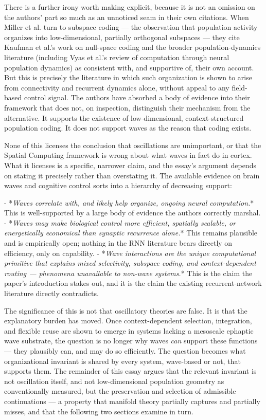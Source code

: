 \documentclass[11pt]{article}
\begin{document}
There is a further irony worth making explicit, because it is not an omission on the authors' part so much as an unnoticed seam in their own citations. When Miller et al. turn to subspace coding — the observation that population activity organizes into low-dimensional, partially orthogonal subspaces — they cite Kaufman et al.'s work on null-space coding and the broader population-dynamics literature (including Vyas et al.'s review of computation through neural population dynamics) as consistent with, and supportive of, their own account. But this is precisely the literature in which such organization is shown to arise from connectivity and recurrent dynamics alone, without appeal to any field-based control signal. The authors have absorbed a body of evidence into their framework that does not, on inspection, distinguish their mechanism from the alternative. It supports the existence of low-dimensional, context-structured population coding. It does not support waves as the reason that coding exists.

None of this licenses the conclusion that oscillations are unimportant, or that the Spatial Computing framework is wrong about what waves in fact do in cortex. What it licenses is a specific, narrower claim, and the essay's argument depends on stating it precisely rather than overstating it. The available evidence on brain waves and cognitive control sorts into a hierarchy of decreasing support:

- *\textit{Waves correlate with, and likely help organize, ongoing neural computation.}* This is well-supported by a large body of evidence the authors correctly marshal.
- *\textit{Waves may make biological control more efficient, spatially scalable, or energetically economical than synaptic recurrence alone.}* This remains plausible and is empirically open; nothing in the RNN literature bears directly on efficiency, only on capability.
- *\textit{Wave interactions are the unique computational primitive that explains mixed selectivity, subspace coding, and context-dependent routing — phenomena unavailable to non-wave systems.}* This is the claim the paper's introduction stakes out, and it is the claim the existing recurrent-network literature directly contradicts.

The significance of this is not that oscillatory theories are false. It is that the explanatory burden has moved. Once context-dependent selection, integration, and flexible reuse are shown to emerge in systems lacking a mesoscale ephaptic wave substrate, the question is no longer why waves \textit{can} support these functions — they plausibly can, and may do so efficiently. The question becomes what organizational invariant is shared by every system, wave-based or not, that supports them. The remainder of this essay argues that the relevant invariant is not oscillation itself, and not low-dimensional population geometry as conventionally measured, but the preservation and selection of admissible continuations — a property that manifold theory partially captures and partially misses, and that the following two sections examine in turn.
\end{document}

